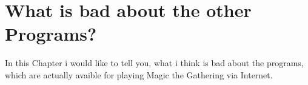 \section{What is bad about the other Programs?}

In this Chapter i would like to tell you, what i think is bad about the programs, which are actually avaible for playing Magic the Gathering via Internet. 


	
	
	
	